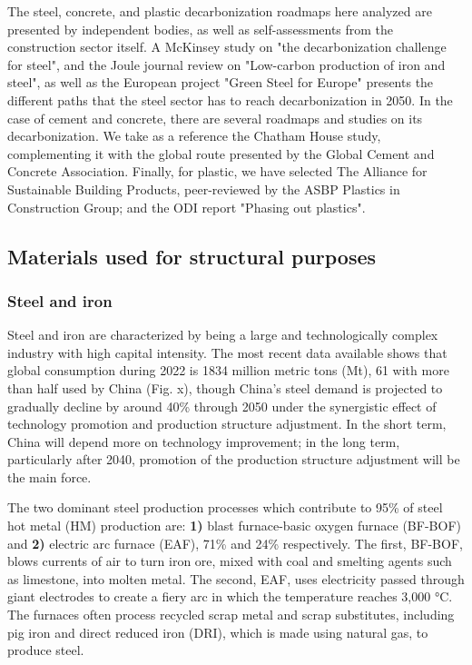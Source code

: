 The steel, concrete, and plastic decarbonization roadmaps here analyzed are presented by independent bodies, as well as self-assessments from the construction sector itself. A McKinsey study on "the decarbonization challenge for steel",\autocite{hoffmann2021decarbonization} and the Joule journal review on "Low-carbon production of iron and steel"\autocite{fan2021low}, as well as the European project "Green Steel for Europe"\autocite{elkerbout2021impact} presents the different paths that the steel sector has to reach decarbonization in 2050. In the case of cement and concrete, there are several roadmaps and studies on its decarbonization. We take as a reference the Chatham House study,\autocite{lehne2018making} complementing it with the global route presented by the Global Cement and Concrete Association.\autocite{cement2021concrete} Finally, for plastic, we have selected The Alliance for Sustainable Building Products, peer-reviewed by the ASBP Plastics in Construction Group;\autocite{asbp_2020} and the ODI report "Phasing out plastics".\autocite{pickard2020phasing}

\subsection{Materials used for structural purposes}
\label{sec:materials_used_for_structural_purposes}

\subsubsection{Steel and iron}
\label{sec:steel_and_iron}

Steel and iron are characterized by being a large and technologically complex industry with high capital intensity. The most recent data available shows that global consumption during 2022 is 1834 million metric tons (Mt), 61 with more than half used by China (Fig. x), though China’s steel demand is projected to gradually decline by around 40\% through 2050\autocite{rissman2020technologies} under the synergistic effect of technology promotion and production structure adjustment. In the short term, China will depend more on technology improvement; in the long term, particularly after 2040, promotion of the production structure adjustment will be the main force.\autocite{zhang2018comprehensive}

The two dominant steel production processes which contribute to 95\% of steel hot metal (HM) production are: \textbf{1)} blast furnace-basic oxygen furnace (BF-BOF) and \textbf{2)} electric arc furnace (EAF), 71\% and 24\% respectively.\autocite{fan2021low} The first, BF-BOF, blows currents of air to turn iron ore, mixed with coal and smelting agents such as limestone, into molten metal. The second, EAF, uses electricity passed through giant electrodes to create a fiery arc in which the temperature reaches 3,000 °C. The furnaces often process recycled scrap metal and scrap substitutes, including pig iron and direct reduced iron (DRI), which is made using natural gas, to produce steel.\autocite{mckinsey_2020}

